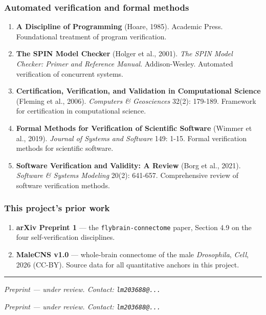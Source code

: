 \documentclass[
]{article}
\begin{document}
\subsubsection{Automated verification and formal
methods}\label{automated-verification-and-formal-methods}

\begin{enumerate}
\def\labelenumi{\arabic{enumi}.}
\setcounter{enumi}{25}
\item
  \textbf{A Discipline of Programming} (Hoare, 1985). Academic Press.
  Foundational treatment of program verification.
\item
  \textbf{The SPIN Model Checker} (Holger et al., 2001). \emph{The SPIN
  Model Checker: Primer and Reference Manual}. Addison-Wesley. Automated
  verification of concurrent systems.
\item
  \textbf{Certification, Verification, and Validation in Computational
  Science} (Fleming et al., 2006). \emph{Computers \& Geosciences}
  32(2): 179-189. Framework for certification in computational science.
\item
  \textbf{Formal Methods for Verification of Scientific Software}
  (Wimmer et al., 2019). \emph{Journal of Systems and Software} 149:
  1-15. Formal verification methods for scientific software.
\item
  \textbf{Software Verification and Validity: A Review} (Borg et al.,
  2021). \emph{Software \& Systems Modeling} 20(2): 641-657.
  Comprehensive review of software verification methods.
\end{enumerate}

\subsubsection{This project's prior
work}\label{this-projects-prior-work}

\begin{enumerate}
\def\labelenumi{\arabic{enumi}.}
\setcounter{enumi}{30}
\item
  \textbf{arXiv Preprint 1} --- the \texttt{flybrain-connectome} paper,
  Section 4.9 on the four self-verification disciplines.
\item
  \textbf{MaleCNS v1.0} --- whole-brain connectome of the male
  \emph{Drosophila}, \emph{Cell}, 2026 (CC-BY). Source data for all
  quantitative anchors in this project.
\end{enumerate}

\begin{center}\rule{0.5\linewidth}{0.5pt}\end{center}

\emph{Preprint --- under review. Contact: \texttt{lm203688@...}}

\emph{Preprint --- under review. Contact: \texttt{lm203688@...}}


\end{document}

